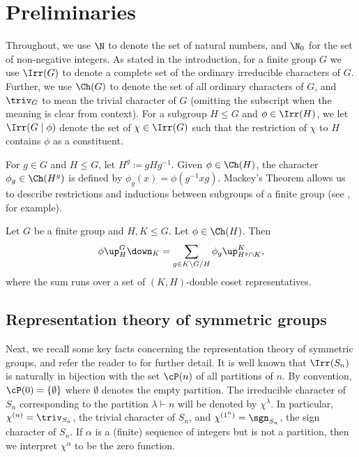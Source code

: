 \section{Preliminaries}\label{sec:prelims}
Throughout, we use $\N$ to denote the set of natural numbers, and $\N_0$ for the set of non-negative integers. 
As stated in the introduction, for a finite group $G$ we use $\Irr(G)$ to denote a complete set of the ordinary irreducible characters of $G$. Further, we use $\Ch(G)$ to denote the set of all ordinary characters of $G$, and $\triv_G$ to mean the trivial character of $G$ (omitting the subscript when the meaning is clear from context).
For a subgroup $H\le G$ and $\phi\in\Irr(H)$, we let $\Irr(G\mid \phi)$ denote the set of $\chi\in\Irr(G)$ such that the restriction of $\chi$ to $H$ contains $\phi$ as a constituent. 

For $g\in G$ and $H\le G$, let $H^g\coloneqq gHg^{-1}$. Given $\phi\in\Ch(H)$, the character $\phi_g\in\Ch(H^g)$ is defined by $\phi_g(x)=\phi(g^{-1}xg)$. Mackey's Theorem allows us to describe restrictions and inductions between  subgroups of a finite group (see \cite[Chapter 5]{I}, for example).
\begin{theorem}[Mackey]\label{thm:Mackey}
	Let $G$ be a finite group and $H,K\le G$. Let $\phi\in\Ch(H)$. Then
	\[ \phi\up_H^G\down_K = \sum_{g\in K\setminus G/H} \phi_g \up_{H^g\cap K}^K, \]
	where the sum runs over a set of $(K,H)$-double coset representatives.
\end{theorem}



\subsection{Representation theory of symmetric groups}\label{sec:prelims-sn}
Next, we recall some key facts concerning the representation theory of symmetric groups, and refer the reader to \cite{J,JK} for further detail.
It is well known that $\Irr(S_n)$ is naturally in bijection with the set $\cP(n)$ of all partitions of $n$. By convention, $\cP(0)=\{\emptyset\}$ where $\emptyset$ denotes the empty partition. 
The irreducible character of $S_n$ corresponding to the partition $\lambda\vdash n$ will be denoted by $\chi^\lambda$. In particular, $\chi^{(n)}=\triv_{S_n}$, the trivial character of $S_n$, and $\chi^{(1^n)}=\sgn_{S_n}$, the sign character of $S_n$. If $\alpha$ is a (finite) sequence of integers but is not a partition, then we interpret $\chi^\alpha$ to be the zero function.

